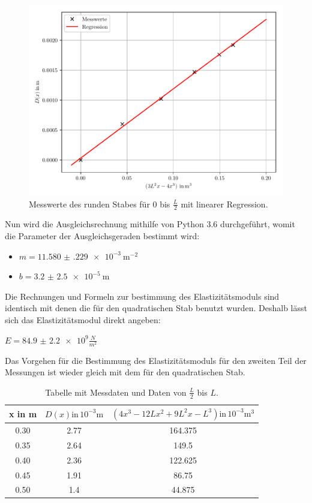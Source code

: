 \begin{figure}[H]
  \centering
  \includegraphics[width=\textwidth]{ausgleichsgerade4.pdf}
  \caption{Messwerte des runden Stabes für $0$ bis $\frac{L}{2}$ mit linearer Regression.}
\end{figure}

Nun wird die Ausgleichsrechnung mithilfe von Python 3.6 durchgeführt, womit die Parameter
der Ausgleichsgeraden bestimmt wird:

\begin{itemize}
  \item $m = \SI{11.580(229)e-3}{\meter\tothe{-2}}$
  \item $b = \SI{3.2(25)e-5}{\meter}$
\end{itemize}

Die Rechnungen und Formeln zur bestimmung des Elastizitätsmoduls sind identisch mit
denen die für den quadratischen Stab benutzt wurden. Deshalb lässt sich das Elastizitätsmodul
direkt angeben:

\centerline{$E= \num{84.9(22)e9} \frac{N}{m^2}$}

Das Vorgehen für die Bestimmung des Elastizitätsmoduls für den zweiten Teil der
Messungen ist wieder gleich mit dem für den quadratischen Stab.

\begin{table}
  \centering
  \caption{Tabelle mit Messdaten und Daten von $\frac{L}{2}$ bis $L$.}
  \begin{tabular}{c c c}
    \toprule
    x in \si{\meter} & $D(x) \text{in} \, 10^{-3} \si{\meter}$ &
    $ \left( 4x^3-12Lx^2+9L^2x-L^3 \right) \text{in} \, 10^{-3} \si{\meter\tothe{3}}$\\
    \midrule
    0.30 & 2.77 &  164.375 \\
    0.35 & 2.64 &  149.5 \\
    0.40 & 2.36 &  122.625 \\
    0.45 & 1.91 &  86.75 \\
    0.50 & 1.4 & 44.875 \\
    \bottomrule
  \end{tabular}
\end{table}

